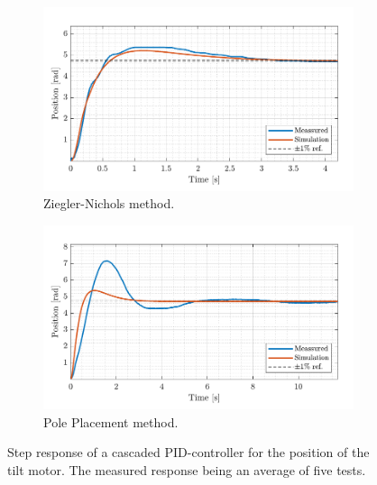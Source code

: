 \documentclass[../../main.tex]{subfiles}
\begin{document}
\begin{figure}[h]
     \centering
     \begin{subfigure}[b]{0.49\textwidth}
         \centering
         \includegraphics[width=\textwidth]{Sections/Test/Images/CascadeTiltTestZN.pdf}
         \caption{Ziegler-Nichols method.}
         \label{fig:Cascade_ZN_tilt}
     \end{subfigure}
     \hfill
     \begin{subfigure}[b]{0.49\textwidth}
         \centering
         \includegraphics[width=\textwidth]{Sections/Test/Images/CascadeTiltTestPP.pdf}
         \caption{Pole Placement method.}
         \label{fig:cascade_model_tilt}
     \end{subfigure}
        \caption{Step response of a cascaded PID-controller for the position of the tilt motor. The measured response being an average of five tests.}
        \label{fig:CascadeTilt}
\end{figure}
\end{document}
